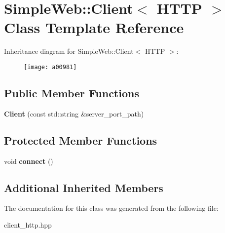 \hypertarget{a00981}{}\section{Simple\+Web\+:\+:Client$<$ H\+T\+TP $>$ Class Template Reference}
\label{a00981}
Inheritance diagram for Simple\+Web\+:\+:Client$<$ H\+T\+TP $>$\+:\begin{figure}[H]
\begin{center}
\leavevmode
\texttt{[image: a00981]}
\end{center}
\end{figure}
\subsection*{Public Member Functions}
\begin{DoxyCompactItemize}
\item 
\mbox{\label{a00981_a47655afc849e459096743876391dae17}} 
{\bfseries Client} (const std\+::string \&server\+\_\+port\+\_\+path)
\end{DoxyCompactItemize}
\subsection*{Protected Member Functions}
\begin{DoxyCompactItemize}
\item 
\mbox{\label{a00981_aebed110274c94b539e2d0a857c24991d}} 
void {\bfseries connect} ()
\end{DoxyCompactItemize}
\subsection*{Additional Inherited Members}


The documentation for this class was generated from the following file\+:\begin{DoxyCompactItemize}
\item 
client\+\_\+http.\+hpp\end{DoxyCompactItemize}
